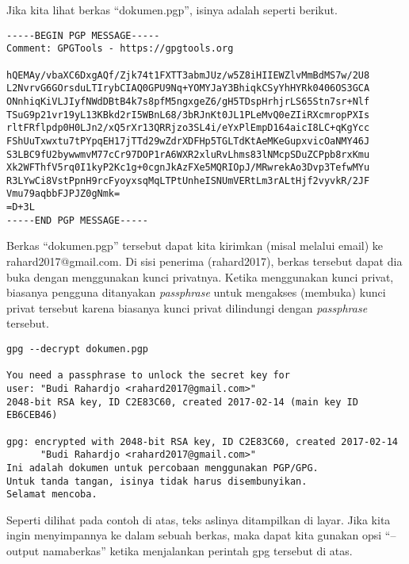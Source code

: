 Jika kita lihat berkas ``dokumen.pgp'', isinya adalah seperti berikut.

\begin{mdframed}[userdefinedwidth=400]
\begin{verbatim}
-----BEGIN PGP MESSAGE-----
Comment: GPGTools - https://gpgtools.org

hQEMAy/vbaXC6DxgAQf/Zjk74t1FXTT3abmJUz/w5Z8iHIIEWZlvMmBdMS7w/2U8
L2NvrvG6GOrsduLTIrybCIAQ0GPU9Nq+YOMYJaY3BhiqkCSyYhHYRk0406OS3GCA
ONnhiqKiVLJIyfNWdDBtB4k7s8pfM5ngxgeZ6/gH5TDspHrhjrLS65Stn7sr+Nlf
TSuG9p21vr19yL13KBkd2rI5WBnL68/3bRJnKt0JL1PLeMvQ0eZIiRXcmropPXIs
rltFRflpdp0H0LJn2/xQ5rXr13QRRjzo3SL4i/eYxPlEmpD164aicI8LC+qKgYcc
FShUuTxwxtu7tPYpqEH17jTTd29wZdrXDFHp5TGLTdKtAeMKeGupxvicOaNMY46J
S3LBC9fU2bywwmvM77cCr97DOP1rA6WXR2xluRvLhms83lNMcpSDuZCPpb8rxKmu
Xk2WFThfV5rq0I1kyP2Kc1g+0cgnJkAzFXe5MQRIOpJ/MRwrekAo3Dvp3TefwMYu
R3LYwCi8VstPpnH9rcFyoyxsqMqLTPtUnheISNUmVERtLm3rALtHjf2vyvkR/2JF
Vmu79aqbbFJPJZ0gNmk=
=D+3L
-----END PGP MESSAGE-----
\end{verbatim}
\end{mdframed}

Berkas ``dokumen.pgp'' tersebut dapat kita kirimkan (misal melalui email) ke
rahard2017@gmail.com. Di sisi penerima (rahard2017), berkas tersebut dapat dia
buka dengan menggunakan kunci privatnya. Ketika menggunakan kunci privat,
biasanya pengguna ditanyakan {\em passphrase} untuk mengakses (membuka) kunci
privat tersebut karena biasanya kunci privat dilindungi dengan {\em passphrase}
tersebut.

\begin{mdframed}[userdefinedwidth=400]
\begin{verbatim}
gpg --decrypt dokumen.pgp

You need a passphrase to unlock the secret key for
user: "Budi Rahardjo <rahard2017@gmail.com>"
2048-bit RSA key, ID C2E83C60, created 2017-02-14 (main key ID EB6CEB46)

gpg: encrypted with 2048-bit RSA key, ID C2E83C60, created 2017-02-14
      "Budi Rahardjo <rahard2017@gmail.com>"
Ini adalah dokumen untuk percobaan menggunakan PGP/GPG.
Untuk tanda tangan, isinya tidak harus disembunyikan.
Selamat mencoba.
\end{verbatim}
\end{mdframed}

Seperti dilihat pada contoh di atas, teks aslinya ditampilkan di layar. Jika
kita ingin menyimpannya ke dalam sebuah berkas, maka dapat kita gunakan opsi
``--output namaberkas'' ketika menjalankan perintah gpg tersebut di atas.

